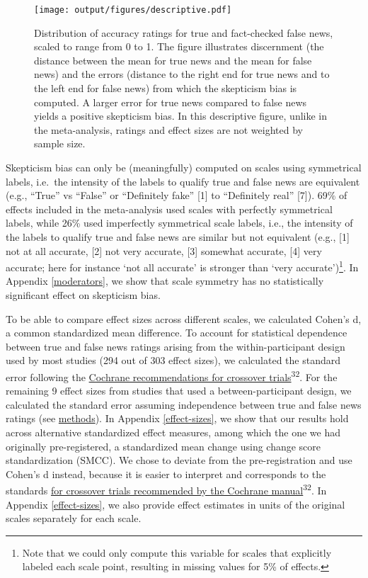 \documentclass[
  doc,floatsintext]{apa6}
\begin{document}
\begin{figure}
\centering
\texttt{[image: output/figures/descriptive.pdf]}
\caption{\label{fig:descriptive}Distribution of accuracy ratings for true and fact-checked false news, scaled to range from 0 to 1. The figure illustrates discernment (the distance between the mean for true news and the mean for false news) and the errors (distance to the right end for true news and to the left end for false news) from which the skepticism bias is computed. A larger error for true news compared to false news yields a positive skepticism bias. In this descriptive figure, unlike in the meta-analysis, ratings and effect sizes are not weighted by sample size.}
\end{figure}

Skepticism bias can only be (meaningfully) computed on scales using symmetrical labels, i.e.~the intensity of the labels to qualify true and false news are equivalent (e.g., ``True'' vs ``False'' or ``Definitely fake'' {[}1{]} to ``Definitely real'' {[}7{]}). 69\% of effects included in the meta-analysis used scales with perfectly symmetrical labels, while 26\% used imperfectly symmetrical scale labels, i.e., the intensity of the labels to qualify true and false news are similar but not equivalent (e.g., {[}1{]} not at all accurate, {[}2{]} not very accurate, {[}3{]} somewhat accurate, {[}4{]} very accurate; here for instance `not all accurate' is stronger than `very accurate')\footnote{Note that we could only compute this variable for scales that explicitly labeled each scale point, resulting in missing values for 5\% of effects.}. In Appendix \ref{moderators}, we show that scale symmetry has no statistically significant effect on skepticism bias.

To be able to compare effect sizes across different scales, we calculated Cohen's d, a common standardized mean difference. To account for statistical dependence between true and false news ratings arising from the within-participant design used by most studies (294 out of 303 effect sizes), we calculated the standard error following the \href{https://training.cochrane.org/handbook/current/chapter-23\#section-23-2-7-3}{Cochrane recommendations for crossover trials}\textsuperscript{32}. For the remaining 9 effect sizes from studies that used a between-participant design, we calculated the standard error assuming independence between true and false news ratings (see \hyperref[methods]{methods}). In Appendix \ref{effect-sizes}, we show that our results hold across alternative standardized effect measures, among which the one we had originally pre-registered, a standardized mean change using change score standardization (SMCC). We chose to deviate from the pre-registration and use Cohen's d instead, because it is easier to interpret and corresponds to the standards \href{https://training.cochrane.org/handbook/current/chapter-23\#section-23-2-7-3}{for crossover trials recommended by the Cochrane manual}\textsuperscript{32}. In Appendix \ref{effect-sizes}, we also provide effect estimates in units of the original scales separately for each scale.
\end{document}
